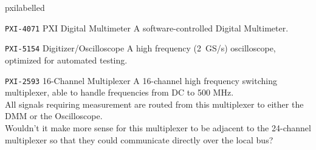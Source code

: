 \begin{labelled}{pxilabelled}
  \item[\pxislotn{5} \texttt{PXI-4071}\hspace{.25em} PXI Digital Multimeter]
    A software-controlled Digital Multimeter.  

  \item[\pxislotn{6} \texttt{PXI-5154}\hspace{.25em} Digitizer/Oscilloscope]
    A high frequency (2~GS/s) oscilloscope, optimized for automated testing.

  \item[\pxislotn{7} \texttt{PXI-2593}\hspace{.25em} 16-Channel Multiplexer]
    A 16-channel high frequency switching multiplexer, able to handle frequencies from DC to 500 MHz.\\\noindent
    \FIXME All signals requiring measurement are routed from this multiplexer to either the DMM or the Oscilloscope.\\\noindent
    \FIXME Wouldn't it make more sense for this multiplexer to be adjacent to the 24-channel multiplexer so that they could communicate directly over the local bus?

\end{labelled}






